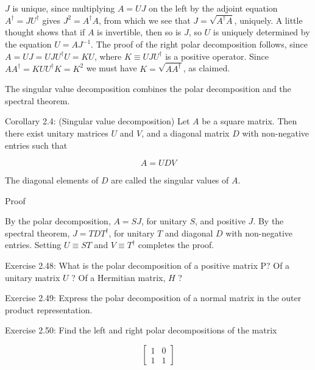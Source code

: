$J$ is unique, since multiplying $A=U J$ on the left by the adjoint equation $A^{\dagger}=J U^{\dagger}$ gives $J^{2}=A^{\dagger} A$, from which we see that $J=\sqrt{A^{\dagger} A}$, uniquely. A little thought shows that if $A$ is invertible, then so is $J$, so $U$ is uniquely determined by the equation $U=A J^{-1}$. The proof of the right polar decomposition follows, since $A=U J=U J U^{\dagger} U=K U$, where $K \equiv U J U^{\dagger}$ is a positive operator. Since $A A^{\dagger}=K U U^{\dagger} K=K^{2}$ we must have $K=\sqrt{A A^{\dagger}}$, as claimed.

The singular value decomposition combines the polar decomposition and the spectral theorem.

Corollary 2.4: (Singular value decomposition) Let $A$ be a square matrix. Then there exist unitary matrices $U$ and $V$, and a diagonal matrix $D$ with non-negative entries such that

$$
A=U D V
$$

The diagonal elements of $D$ are called the singular values of $A$.

Proof

By the polar decomposition, $A=S J$, for unitary $S$, and positive $J$. By the spectral theorem, $J=T D T^{\dagger}$, for unitary $T$ and diagonal $D$ with non-negative entries. Setting $U \equiv S T$ and $V \equiv T^{\dagger}$ completes the proof.

Exercise 2.48: What is the polar decomposition of a positive matrix P? Of a unitary matrix $U$ ? Of a Hermitian matrix, $H$ ?

Exercise 2.49: Express the polar decomposition of a normal matrix in the outer product representation.

Exercise 2.50: Find the left and right polar decompositions of the matrix

$$
\left[\begin{array}{ll}
1 & 0 \\
1 & 1
\end{array}\right]
$$
